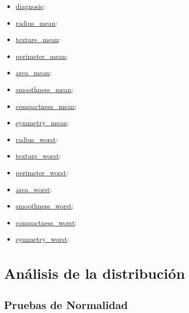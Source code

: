 \documentclass[a4paper, 12pt]{article}
\begin{document}
\begin{itemize}

	\item \underline{diagnosis}:
	
	\item \underline{radius\_mean}:
	
	\item \underline{texture\_mean}:
	
	\item \underline{perimeter\_mean}:
	
	\item \underline{area\_mean}:
	
	\item \underline{smoothness\_mean}:
	
	\item \underline{compactness\_mean}:
	
	\item \underline{symmetry\_mean}:
	
	\item \underline{radius\_worst}:
	
	\item \underline{texture\_worst}:
	
	\item \underline{perimeter\_worst}:
	
	\item \underline{area\_worst}:
	
	\item \underline{smoothness\_worst}:
	
	\item \underline{compactness\_worst}:
	
	\item \underline{symmetry\_worst}:
	
 
\end{itemize}
	












\newpage

\section{Análisis de la distribución}

\subsection{Pruebas de Normalidad}
\end{document}
